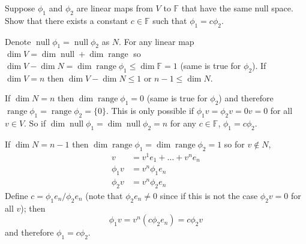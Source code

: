 \documentclass[11pt,a4paper]{scrartcl}
\DeclareMathOperator{\range}{range}
\DeclareMathOperator{\nspace}{null}
\newcounter{problem}
\begin{document}
\begin{problem}[3.B.30]
{    
    Suppose $\phi_1$ and $\phi_2$ are linear maps from
    $V$ to $\mathbb{F}$ that have the same null space.
    Show that there exists a constant $c\in \mathbb{F}$
    such that $\phi_1=c\phi_2$.
}
{
    Denote
    $\nspace \phi_1=\nspace \phi_2$ as $N$. For any linear map
    $\dim V = \dim \nspace + \dim \range$ so 
    $\dim V - \dim N = \dim \range \phi_1 \leq 
    \dim \mathbb{F}=1$ (same is true for $\phi_2$).
    If $\dim V=n$ then $\dim V - \dim N \leq 1$ or
    $n-1 \leq \dim N$.    
    
    If $\dim N = n$ then $\dim \range \phi_1 = 0$ (same is true for $\phi_2$) and therefore
    $\range \phi_1 = \range \phi_2=\{0\}$. This is only possible if $\phi_1v=\phi_2v=0v=0$ for all $v \in V$.
    So if $\dim \nspace \phi_1 = \dim \nspace \phi_2=n$ for any
    $c \in \mathbb{F}$, $\phi_1=c\phi_2$. 
    
    If $\dim N=n-1$ then $\dim \range \phi_1 = \dim \range \phi_2=1$
    so for $v \notin N$,
    \begin{align*}
    v & = v^1 e_1 + \ldots + v^n e_n \\
    \phi_1 v & =  v^n \phi_1 e_n \\
    \phi_2 v & =  v^n \phi_2 e_n        
    \end{align*}
    Define $c=\phi_1 e_n / \phi_2 e_n$ (note that $\phi_2 e_n \neq 0$ since
    if this is not the case $\phi_2 v =0$ for all $v$); then
    \[
    \phi_1 v = v^n (c\phi_2 e_n) = c \phi_2 v
    \]
    and therefore $\phi_1=c\phi_2$.
}
\end{problem}
\newpage
\end{document}
